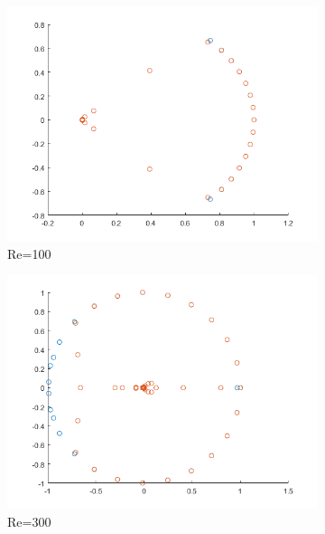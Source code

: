 \documentclass[letterpaper,12pt,peerreviewca,draftcls]{IEEEtran}
\begin{document}
\begin{figure}[!h]
	\centering
	\begin{subfigure}[t]{0.48\textwidth}
		\includegraphics[width=\linewidth]{"Figure 17a"}
		\caption{Re=100}
	\end{subfigure}
	\begin{subfigure}[t]{0.48\textwidth}
		\includegraphics[width=\linewidth]{"Figure 17b"}
		\caption{Re=300}
	\end{subfigure}
	\begin{subfigure}[t]{0.48\textwidth}

\end{subfigure}
\end{figure}
\end{document}
